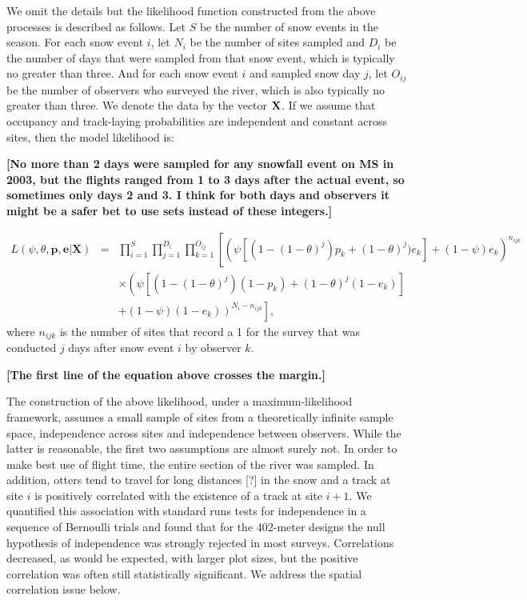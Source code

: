 \documentclass[11pt]{article}
\begin{document}
    We omit the details but the likelihood function constructed from the above
    processes is described as follows. Let $S$  be the number of snow events in
    the season. For each snow event $i$, let $N_i$ be the number of sites
    sampled and $D_i$ be the number of days that were sampled from that snow
    event, which is typically no greater than three. And for each snow event
    $i$ and sampled snow day $j$, let $O_{ij}$ be the number of observers who
    surveyed the river, which is also typically no greater than three.  We
    denote the data by the vector ${\bf X}$. If we assume that occupancy and
    track-laying probabilities are independent and constant across sites, then
    the model likelihood is:

    \textbf{[No more than 2 days were sampled for any snowfall event
    on MS in 2003, but the flights ranged from 1 to 3 days after the actual
    event, so sometimes only days 2 and 3. I think for both days and observers
    it might be a safer bet to use sets instead of these integers.]}

    \begin{eqnarray*}
        L(\psi, \theta, \mathbf{p}, \mathbf{e}|\mathbf{X})& =&
        \prod_{i=1}^S \prod_{j=1}^{D_i} \prod_{k=1}^{O_{ij}} \left[ \left( \psi
        [(1-(1-\theta)^j) p_k +(1-\theta)^j) e_k ] + (1-\psi)e_k
        \right)^{n_{ijk}} \right. \\
        && \times \left( \psi[(1-(1-\theta)^j)(1-p_k)+(1-\theta)^j(1-e_k)]
        \right. \\
        && \left. \left. +(1-\psi)(1-e_k) \right)^{N_i-n_{ijk}}\right],
    \end{eqnarray*}
    where $n_{ijk}$ is the number of sites that record a 1 for the survey that
    was conducted $j$ days after snow event $i$ by observer $k$.

    \textbf{[The first line of the equation above crosses the margin.]}

    The construction of the above likelihood, under a maximum-likelihood
    framework, assumes a small sample of sites from a theoretically infinite
    sample space, independence across sites and independence between observers.
    While the latter is reasonable, the first two assumptions are almost surely
    not. In order to make best use of flight time, the entire section of the
    river was sampled. In addition, otters tend to travel for long distances
    [?] in the snow and a track at site $i$ is positively correlated with the
    existence of a track at site $i+1$. We quantified this association with
    standard runs tests for independence in a sequence of Bernoulli trials and
    found that for the 402-meter designs the null hypothesis of independence
    was strongly rejected in most surveys.  Correlations decreased, as would be
    expected, with larger plot sizes, but the positive correlation was often
    still statistically significant.  We address the spatial correlation issue
    below.
\end{document}

